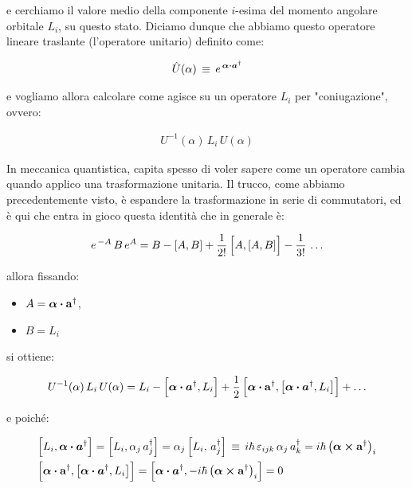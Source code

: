 	e cerchiamo il valore medio della componente $i$-esima del momento angolare orbitale $L_i$, su questo stato. Diciamo dunque che abbiamo questo operatore lineare traslante (l'operatore unitario) definito come: 

\begin{align*}
	\hat{U}(\alpha) \, \equiv \, e^{\, \vb*{\alpha} \vdot \vb*{a}^{\dagger}}
\end{align*}

	e vogliamo allora calcolare come agisce su un operatore $L_i$ per "coniugazione", ovvero:
	
\begin{align*}
	U^{-1}(\alpha) \, L_i \, U(\alpha) 
\end{align*}

	In meccanica quantistica, capita spesso di voler sapere come un operatore cambia quando applico una trasformazione unitaria. Il trucco, come abbiamo precedentemente visto, è espandere la trasformazione in serie di commutatori, ed è qui che entra in gioco questa identità che in generale è:
	
\begin{align*}
	e^{\, - A} \, B \, e^{A} = B - \qty[A, B] + \frac{1}{2!} \, \qty\Big[A, \qty[A, B] ]- \frac{1}{3!} \, \ldots
\end{align*}
	
	allora fissando:

\begin{itemize}
	\item $A = \vb*{\alpha} \vdot \vb{a}^{\dagger}$, 
	\item $B = L_i$
\end{itemize}
	
	si ottiene:
	
\begin{align*}
	 U^{-1}(\alpha) \, L_i \, U(\alpha)  = L_i - \qty\Big[\vb*{\alpha} \vdot \vb*{a}^{\dagger}, L_i ] + \frac{1}{2} \, \qty\Big[\vb*{\alpha} \vdot \vb{a}^{\dagger}, \qty\big[\vb*{\alpha} \vdot \vb*{a}^{\dagger}, L_i]] + \ldots
\end{align*}
	
	e poiché:
	
\begin{align*}
	&\qty\Big[L_i, \vb*{\alpha} \vdot \vb*{a}^{\dagger}] = \qty\Big[L_i, \alpha_j \, a_j^{\dagger}]  = \alpha_j \, \qty\Big[L_i, \, a_j^{\dagger}]  \, \equiv \, i\hbar \, \varepsilon_{ijk} \, \alpha_j \, a_k^{\dagger} = i \hbar \, \qty(\vb*{\alpha} \cp \vb{a}^{\dagger})_i \\
	& \qty\Big[\vb*{\alpha} \vdot \vb{a}^{\dagger}, \qty\big[\vb*{\alpha} \vdot \vb*{a}^{\dagger}, L_i]] = \qty\Big[\vb*{\alpha} \vdot \vb*{a}^{\dagger}, - i\hbar \, \qty(\vb*{\alpha} \cp \vb{a}^{\dagger})_i ] = 0
\end{align*}


